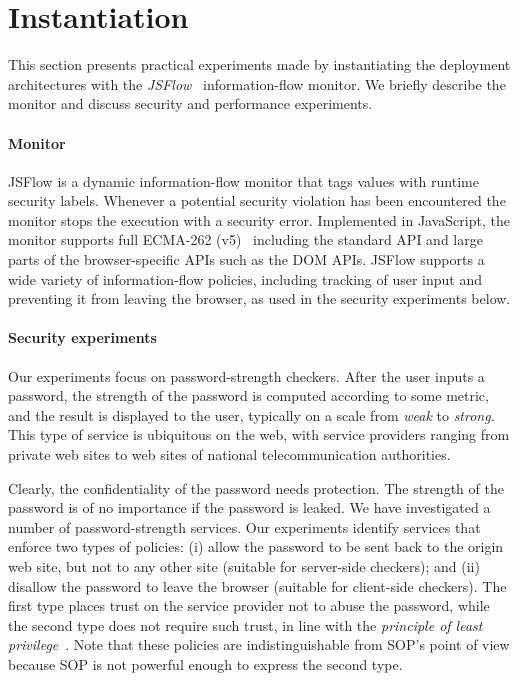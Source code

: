 \documentclass{llncs}
\begin{document}

\vspace{-.4cm}
\section{Instantiation}
\label{sec:case}
\vspace{-.4cm}

This section presents practical experiments made by instantiating the deployment
architectures with the \emph{JSFlow}~\cite{Hedin:Sabelfeld:CSF12,JSFlow} information-flow monitor. 
We briefly describe the monitor and discuss security and performance experiments.

\vspace{-.4cm}
\paragraph{Monitor}

JSFlow is a dynamic information-flow monitor that tags values with runtime
security labels. Whenever a potential security
violation has been encountered the monitor stops the execution with a security
error. Implemented in JavaScript, the monitor supports
full 
ECMA-262 (v5)~\cite{ecma:262:5} including the standard API and large parts of the
browser-specific APIs such as the DOM APIs. 
JSFlow supports a wide variety of information-flow policies,
including tracking of user input and preventing it from leaving the
browser, as used in
the security experiments below.

\vspace{-.4cm}
\paragraph{Security experiments}
Our experiments focus on password-strength checkers. 
After the user inputs a password, the strength of the password is computed according
to some metric, and the result is displayed to the user, typically on a scale
from \emph{weak} to \emph{strong}. This type of service is ubiquitous
on the web, with service providers ranging from private web sites to web sites
of national telecommunication authorities.

Clearly, the confidentiality of the password needs protection.  The
strength of the password is of no importance if the password is leaked.  We
have investigated a number of password-strength services. 
Our experiments identify services that enforce two types of policies: (i)
allow the password to be sent back to the origin web site, but not to
any other site (suitable for server-side checkers); and (ii) disallow the password
to leave the browser (suitable for client-side checkers). 
The first type places trust on the service provider not to
abuse the password, while the second type does not require such trust,
in line with the \emph{principle of least
privilege}~\cite{Saltzer:Schroeder:TCB}.
Note that these policies are indistinguishable from SOP's point of
view because SOP is not powerful enough to express the second type.
\end{document}
